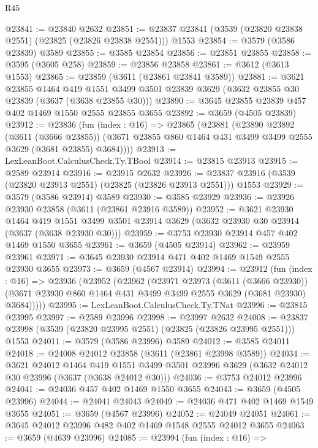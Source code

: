 \begin{lexlean}{R45}
\begin{coremodule}
@23841 := @23840 @2632
@23851 := @23837 @23841 (@3539 (@23820 @23838 @2551) (@23825 (@23826 @23838 @2551))) @1553
@23854 := @3579 (@3586 @23839) @3589
@23855 := @3585 @23854
@23856 := @23851 @23855
@23858 := @3595 (@3605 @258)
@23859 := @23856 @23858
@23861 := @3612 (@3613 @1553)
@23865 := @23859 (@3611 (@23861 @23841 @3589))
@23881 := @3621
    @23855
    @1464
    @419
    @1551
    @3499
    @3501
    @23839
    @3629
    (@3632 @23855 @30 @23839 (@3637 (@3638 @23855 @30)))
@23890 := @3645 @23855 @23839 @457 @402 @1469 @1550 @2555 @23855 @3655
@23892 := @3659 (@4505 @23839)
@23912 := @23836
    (fun (index : @16) =>
    @23865
      (@23881
        (@23890
          @23892
          (@3611 (@3666 @23855))
          (@3671 @23855 @860 @1464 @431 @3499 @3499 @2555 @3629 (@3681 @23855) @3684))))
@23913 := LexLeanBoot.CalculusCheck.Ty.TBool
@23914 := @23815 @23913
@23915 := @2589 @23914
@23916 := @23915 @2632
@23926 := @23837 @23916 (@3539 (@23820 @23913 @2551) (@23825 (@23826 @23913 @2551))) @1553
@23929 := @3579 (@3586 @23914) @3589
@23930 := @3585 @23929
@23936 := @23926 @23930 @23858 (@3611 (@23861 @23916 @3589))
@23952 := @3621
    @23930
    @1464
    @419
    @1551
    @3499
    @3501
    @23914
    @3629
    (@3632 @23930 @30 @23914 (@3637 (@3638 @23930 @30)))
@23959 := @3753 @23930 @23914 @457 @402 @1469 @1550 @3655
@23961 := @3659 (@4505 @23914)
@23962 := @23959 @23961
@23971 := @3645 @23930 @23914 @471 @402 @1469 @1549 @2555 @23930 @3655
@23973 := @3659 (@4567 @23914)
@23994 := @23912
    (fun (index : @16) =>
    @23936
      (@23952
        (@23962
          (@23971
            @23973
            (@3611 (@3666 @23930))
            (@3671 @23930 @860 @1464 @431 @3499 @3499 @2555 @3629 (@3681 @23930) @3684)))))
@23995 := LexLeanBoot.CalculusCheck.Ty.TNat
@23996 := @23815 @23995
@23997 := @2589 @23996
@23998 := @23997 @2632
@24008 := @23837 @23998 (@3539 (@23820 @23995 @2551) (@23825 (@23826 @23995 @2551))) @1553
@24011 := @3579 (@3586 @23996) @3589
@24012 := @3585 @24011
@24018 := @24008 @24012 @23858 (@3611 (@23861 @23998 @3589))
@24034 := @3621
    @24012
    @1464
    @419
    @1551
    @3499
    @3501
    @23996
    @3629
    (@3632 @24012 @30 @23996 (@3637 (@3638 @24012 @30)))
@24036 := @3753 @24012 @23996
@24041 := @24036 @457 @402 @1469 @1550 @3655
@24043 := @3659 (@4505 @23996)
@24044 := @24041 @24043
@24049 := @24036 @471 @402 @1469 @1549 @3655
@24051 := @3659 (@4567 @23996)
@24052 := @24049 @24051
@24061 := @3645 @24012 @23996 @482 @402 @1469 @1548 @2555 @24012 @3655
@24063 := @3659 (@4639 @23996)
@24085 := @23994
    (fun (index : @16) =>

\end{coremodule}
\end{lexlean}
